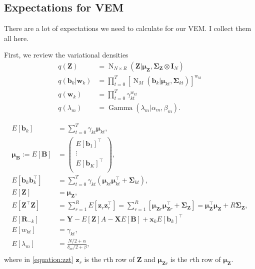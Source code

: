 \documentclass[11pt,authoryear]{article}
\DeclareMathOperator*{\N}{N}
\DeclareMathOperator*{\gm}{Gamma}
\newcommand{\bs}[1]{\boldsymbol{#1}}
\begin{document}
\subsection{Expectations for VEM}
There are a lot of expectations we need to calculate for our VEM. I collect them all here.

First, we review the variational densities
\begin{align}
q(\bs{Z}) &= \N_{N\times R}(\bs{Z} | \bs{\mu}_{\bs{Z}}, \bs{\Sigma}_{\bs{Z}} \otimes \bs{I}_N)\\
q(\bs{b}_k|\bs{w}_k) &= \prod_{t = 0}^T \left[\N_{M}(\bs{b}_k|\bs{\mu}_{kt}, \bs{\Sigma}_{kt})\right]^{w_{kt}}\\
q(\bs{w}_k) &= \prod_{t = 0}^T \gamma_{kt}^{w_{kt}}\\
q(\lambda_m) &= \gm(\lambda_m|\alpha_m, \beta_m).
\end{align}

\begin{align}
\label{equation:e.b}E[\bs{b}_k] &= \sum_{t = 0}^T \gamma_{kt}\bs{\mu}_{kt},\\
\bs{\mu}_{\bs{B}} := E[\bs{B}] &=
\left(
\begin{array}{c}
E[\bs{b}_1]^{\intercal}\\
\vdots\\
E[\bs{b}_K]^{\intercal}\\
\end{array}
\right),\\
\label{equation:e.b.bt}E[\bs{b}_k\bs{b}_{k}^{\intercal}] &= \sum_{t = 0}^T \gamma_{kt}\left(\bs{\mu}_{kt}\bs{\mu}_{kt}^{\intercal} + \bs{\Sigma}_{kt}\right),\\
E[\bs{Z}] &= \bs{\mu}_{\bs{Z}},\\
\label{equation:zzt}E[\bs{Z}^{\intercal}\bs{Z}] &= \sum_{r = 1}^R E[\bs{z}_r\bs{z}_r^{\intercal}] = \sum_{r = 1}^R\left[\bs{\mu}_{\bs{Z}r}\bs{\mu}_{\bs{Z}r}^{\intercal} + \bs{\Sigma}_{\bs{Z}}\right] = \bs{\mu}_{\bs{Z}}^{\intercal}\bs{\mu}_{\bs{Z}} + R\bs{\Sigma}_{\bs{Z}},\\
E[\bs{R}_{-k}] &= \bs{Y} - E[\bs{Z}]A - \bs{X}E[\bs{B}] + \bs{x}_kE[\bs{b}_k]^{\intercal}\\
E[w_{kt}] &= \gamma_{kt},\\
E[\lambda_m] &= \frac{N/2 + \alpha}{\delta_m / 2 + \beta},\\
\end{align}
where in \eqref{equation:zzt} $\bs{z}_r$ is the $r$th row of $\bs{Z}$
and $\bs{\mu}_{\bs{Z}r}$ is the $r$th row of $\bs{\mu}_{\bs{Z}}$.
\end{document}
